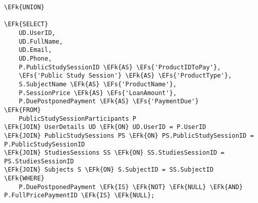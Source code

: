 \documentclass[11pt]{article}
\newcommand{\EFs}[1]{\textcolor{EFs}{#1}} %
\newcommand{\EFk}[1]{\textcolor{EFk}{\textbf{#1}}} %
\begin{document}
\begin{Code}
\begin{Verbatim}
\EFk{UNION}

\EFk{SELECT} 
    UD.UserID,
    UD.FullName,
    UD.Email,
    UD.Phone,
    P.PublicStudySessionID \EFk{AS} \EFs{'ProductIDToPay'},
    \EFs{'Public Study Session'} \EFk{AS} \EFs{'ProductType'},
    S.SubjectName \EFk{AS} \EFs{'ProductName'},
    P.SessionPrice \EFk{AS} \EFs{'LoanAmount'},
    P.DuePostponedPayment \EFk{AS} \EFs{'PaymentDue'}
\EFk{FROM} 
    PublicStudySessionParticipants P
\EFk{JOIN} UserDetails UD \EFk{ON} UD.UserID = P.UserID
\EFk{JOIN} PublicStudySessions PS \EFk{ON} PS.PublicStudySessionID = P.PublicStudySessionID
\EFk{JOIN} StudiesSessions SS \EFk{ON} SS.StudiesSessionID = PS.StudiesSessionID
\EFk{JOIN} Subjects S \EFk{ON} S.SubjectID = SS.SubjectID
\EFk{WHERE} 
    P.DuePostponedPayment \EFk{IS} \EFk{NOT} \EFk{NULL} \EFk{AND} P.FullPricePaymentID \EFk{IS} \EFk{NULL};
\end{Verbatim}
\end{Code}
\end{document}
